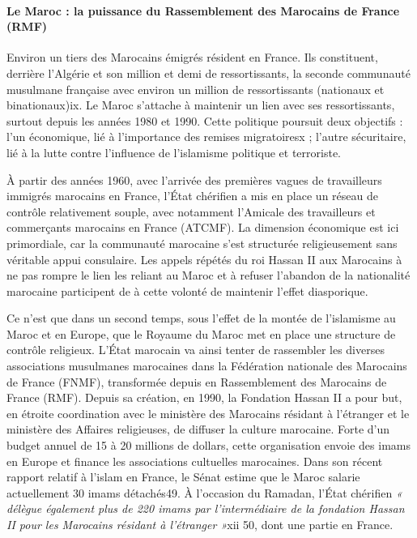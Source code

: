   \paragraph{Le Maroc : la puissance du Rassemblement des Marocains de
  France (RMF)}


Environ un tiers des Marocains émigrés résident en France. Ils
constituent, derrière l'Algérie et son million et demi de
ressortissants, la seconde communauté musulmane française avec environ
un million de ressortissants (nationaux et binationaux)ix. Le Maroc
s'attache à maintenir un lien avec ses ressortissants, surtout depuis
les années 1980 et 1990. Cette politique poursuit deux objectifs : l'un
économique, lié à l'importance des remises migratoiresx ; l'autre
sécuritaire, lié à la lutte contre l'influence de l'islamisme politique
et terroriste.

À partir des années 1960, avec l'arrivée des premières vagues de
travailleurs immigrés marocains en France, l'État chérifien a mis en
place un réseau de contrôle relativement souple, avec notamment
l'Amicale des travailleurs et commerçants marocains en France (ATCMF).
La dimension économique est ici primordiale, car la communauté marocaine
s'est structurée religieusement sans véritable appui consulaire. Les
appels répétés du roi Hassan II aux Marocains à ne pas rompre le lien
les reliant au Maroc
et à refuser l'abandon de la nationalité marocaine participent de à
cette volonté de maintenir l'effet diasporique.

Ce n'est que dans un second temps, sous l'effet de la montée de
l'islamisme au Maroc et en Europe, que le Royaume du Maroc met en place
une structure de contrôle religieux. L'État marocain va ainsi tenter de
rassembler les diverses associations musulmanes marocaines dans la
Fédération nationale des Marocains de France (FNMF), transformée depuis
en Rassemblement des Marocains de France (RMF). Depuis sa création, en
1990, la Fondation Hassan II a pour but, en étroite coordination avec le
ministère des Marocains résidant à l'étranger et le ministère des
Affaires religieuses, de diffuser la culture marocaine. Forte d'un
budget annuel de 15 à 20 millions de dollars, cette organisation envoie
des imams en Europe et finance les associations cultuelles marocaines.
Dans son récent rapport relatif à l'islam en France, le Sénat estime que
le Maroc salarie actuellement 30 imams détachés49. À l'occasion du
Ramadan, l'État chérifien \emph{« délègue également plus de 220 imams
par l'intermédiaire de la fondation Hassan II pour les Marocains
résidant à l'étranger »}xii 50, dont une partie en France.

